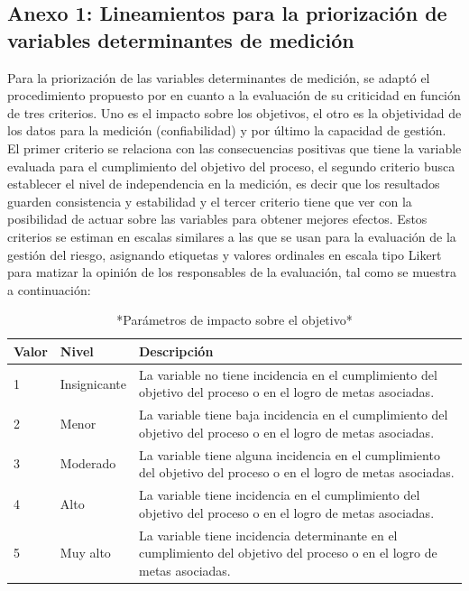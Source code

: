 \documentclass[
]{book}
\begin{document}
\hypertarget{anexo-1-lineamientos-para-la-priorizaciuxf3n-de-variables-determinantes-de-mediciuxf3n}{%
\subsection{Anexo 1: Lineamientos para la priorización de variables determinantes de medición}\label{anexo-1-lineamientos-para-la-priorizaciuxf3n-de-variables-determinantes-de-mediciuxf3n}}

Para la priorización de las variables determinantes de medición, se adaptó el procedimiento propuesto por \citet{plasencia2017procedimiento} en cuanto a la evaluación de su criticidad en función de tres criterios. Uno es el impacto sobre los objetivos, el otro es la objetividad de los datos para la medición (confiabilidad) y por último la capacidad de gestión. El primer criterio se relaciona con las consecuencias positivas que tiene la variable evaluada para el cumplimiento del objetivo del proceso, el segundo criterio busca establecer el nivel de independencia en la medición, es decir que los resultados guarden consistencia y estabilidad y el tercer criterio tiene que ver con la posibilidad de actuar sobre las variables para obtener mejores efectos. Estos criterios se estiman en escalas similares a las que se usan para la evaluación de la gestión del riesgo, asignando etiquetas y valores ordinales en escala tipo Likert para matizar la opinión de los responsables de la evaluación, tal como se muestra a continuación:

\begin{table}

\caption{\label{tab:tablaA}*Parámetros de impacto sobre el objetivo*}
\centering
\begin{tabular}[t]{l|l|l}
\hline
Valor & Nivel & Descripción\\
\hline
1 & Insignicante & La variable no tiene incidencia en el cumplimiento del objetivo del proceso o en el logro de metas asociadas.\\
\hline
2 & Menor & La variable tiene baja incidencia en el cumplimiento del objetivo del proceso o en el logro de metas asociadas.\\
\hline
3 & Moderado & La variable tiene alguna incidencia en el cumplimiento del objetivo del proceso o en el logro de metas asociadas.\\
\hline
4 & Alto & La variable tiene incidencia en el cumplimiento del objetivo del proceso o en el logro de metas asociadas.\\
\hline
5 & Muy alto & La variable tiene incidencia determinante en el cumplimiento del objetivo del proceso o en el logro de metas asociadas.\\
\hline
\end{tabular}
\end{table}
\end{document}
